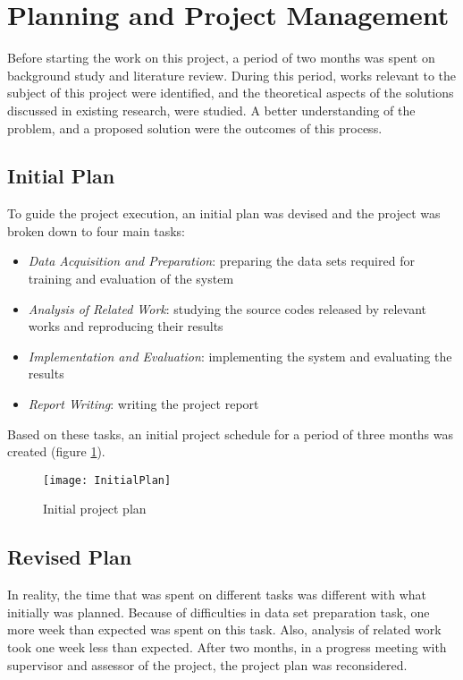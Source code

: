 \section{Planning and Project Management}

Before starting the work on this project, a period of two months was spent on background study and literature review. During this period, works relevant to the subject of this project were identified, and the theoretical aspects of the solutions discussed in existing research, were studied. A better understanding of the problem, and a proposed solution were the outcomes of this process. 

\subsection{Initial Plan}
To guide the project execution, an initial plan was devised and the project was broken down to four main tasks: 

\begin{itemize}
    \item \emph{Data Acquisition and Preparation}: preparing the data sets required for training and evaluation of the system
    \item \emph{Analysis of Related Work}: studying the source codes released by relevant works and reproducing their results
    \item \emph{Implementation and Evaluation}: implementing the system and evaluating the results
    \item \emph{Report Writing}: writing the project report
\end{itemize}

Based on these tasks, an initial project schedule for a period of three months was created (figure \ref{fig:initialplan}). 

\begin{figure}
    \centering
    \texttt{[image: InitialPlan]}
    \caption{Initial project plan}
    \label{fig:initialplan}
\end{figure}

\subsection{Revised Plan}
In reality, the time that was spent on different tasks was different with what initially was planned. Because of difficulties in data set preparation task, one more week than expected was spent on this task. Also, analysis of related work took one week less than expected. After two months, in a progress meeting with supervisor and assessor of the project, the project plan was reconsidered. 

